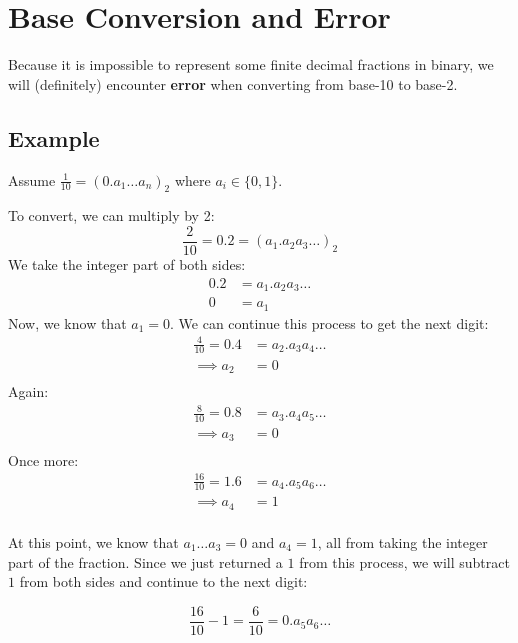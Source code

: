 \section{Base Conversion and Error}

Because it is impossible to represent some finite decimal fractions in binary,
we will (definitely) encounter \textbf{error} when converting from base-10 to base-2.


\subsection{Example}

Assume $\frac{1}{10} = (0.a_1 \dots a_n)_2$ where $a_i \in \{0, 1\}$.

To convert, we can multiply by 2:
\begin{equation*}
  \frac{2}{10} = 0.2 = (a_1 . a_2 a_3 \dots)_2
\end{equation*}
We take the integer part of both sides:
\begin{align*}
  0.2 &= a_1.a_2 a_3 \dots \\
  0 &= a_1
\end{align*}
Now, we know that $a_1 = 0$. We can continue this process to get the next
digit:
\begin{align*}
  \frac{4}{10} = 0.4 &= a_2.a_3 a_4 \dots \\
  \implies a_2 &= 0 \\
\end{align*}
Again:
\begin{align*}
  \frac{8}{10} = 0.8 &= a_3.a_4 a_5 \dots \\
  \implies a_3 &= 0 \\
\end{align*}
Once more:
\begin{align*}
  \frac{16}{10} = 1.6 &= a_4.a_5 a_6 \dots \\
  \implies a_4 &= 1 \\
\end{align*}

At this point, we know that $a_1 \dots a_3 = 0$ and $a_4 = 1$, all from taking
the integer part of the fraction. Since we just returned a $1$ from this process,
we will subtract $1$ from both sides and continue to the next digit:

\begin{equation*}
  \frac{16}{10} - 1 = \frac{6}{10} = 0.a_5 a_6 \dots
\end{equation*}

